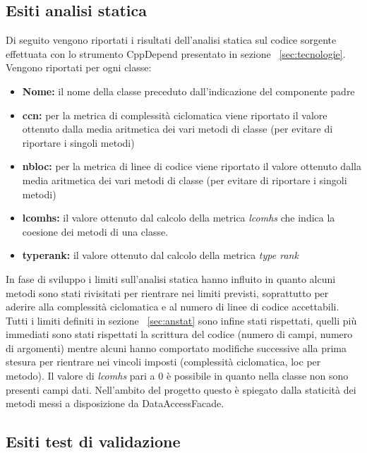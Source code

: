 \documentclass[a4paper,13pt,twoside]{article}
\begin{document}
\subsection{Esiti analisi statica} \label{sec:esiti}
Di seguito vengono riportati i risultati dell'analisi statica sul codice sorgente effettuata con lo strumento CppDepend presentato in sezione ~\ref{sec:tecnologie}. Vengono riportati per ogni classe:
\begin{itemize}
	\item \textbf{Nome: } il nome della classe preceduto dall'indicazione del componente padre
	\item \textbf{ccn: } per la metrica di complessità ciclomatica viene riportato il valore ottenuto dalla media aritmetica dei vari metodi di classe (per evitare di riportare i singoli metodi)
	\item \textbf{nbloc: } per la metrica di linee di codice viene riportato il valore ottenuto dalla media aritmetica dei vari metodi di classe (per evitare di riportare i singoli metodi)
	\item \textbf{lcomhs: } il valore ottenuto dal calcolo della metrica \textit{lcomhs} che indica la coesione dei metodi di una classe.
	\item \textbf{typerank: } il valore ottenuto dal calcolo della metrica \textit{type rank}
\end{itemize}
In fase di sviluppo i limiti sull'analisi statica hanno influito in quanto alcuni metodi sono stati rivisitati per rientrare nei limiti previsti, soprattutto per aderire alla complessità ciclomatica e al numero di linee di codice accettabili. Tutti i limiti definiti in sezione ~\ref{sec:anstat} sono infine stati rispettati, quelli più immediati sono stati rispettati la scrittura del codice (numero di campi, numero di argomenti) mentre alcuni hanno comportato modifiche successive alla prima stesura per rientrare nei vincoli imposti (complessità ciclomatica, loc per metodo). Il valore di \textit{lcomhs} pari a 0 è possibile in quanto nella classe non sono presenti campi dati. Nell'ambito del progetto questo è spiegato dalla staticità dei metodi messi a disposizione da DataAccessFacade.\\ 


\subsection{Esiti test di validazione}

\end{document}

